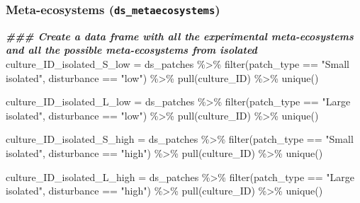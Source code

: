 \documentclass[
]{article}
\newenvironment{Shaded}{\begin{snugshade}}{\end{snugshade}}
\newcommand{\DocumentationTok}[1]{\textcolor[rgb]{0.56,0.35,0.01}{\textbf{\textit{#1}}}}
\newcommand{\FunctionTok}[1]{\textcolor[rgb]{0.00,0.00,0.00}{#1}}
\newcommand{\NormalTok}[1]{#1}
\newcommand{\OtherTok}[1]{\textcolor[rgb]{0.56,0.35,0.01}{#1}}
\newcommand{\SpecialCharTok}[1]{\textcolor[rgb]{0.00,0.00,0.00}{#1}}
\newcommand{\StringTok}[1]{\textcolor[rgb]{0.31,0.60,0.02}{#1}}
\begin{document}
\hypertarget{meta-ecosystems-ds_metaecosystems}{%
\subsubsection{\texorpdfstring{Meta-ecosystems
(\texttt{ds\_metaecosystems})}{Meta-ecosystems (ds\_metaecosystems)}}\label{meta-ecosystems-ds_metaecosystems}}

\begin{Shaded}
\begin{Highlighting}[]
\DocumentationTok{\#\#\# Create a data frame with all the experimental meta{-}ecosystems and all the possible meta{-}ecosystems from isolated}
\NormalTok{culture\_ID\_isolated\_S\_low }\OtherTok{=}\NormalTok{ ds\_patches }\SpecialCharTok{\%\textgreater{}\%}
  \FunctionTok{filter}\NormalTok{(patch\_type }\SpecialCharTok{==} \StringTok{"Small isolated"}\NormalTok{,}
\NormalTok{         disturbance }\SpecialCharTok{==} \StringTok{"low"}\NormalTok{) }\SpecialCharTok{\%\textgreater{}\%}
  \FunctionTok{pull}\NormalTok{(culture\_ID) }\SpecialCharTok{\%\textgreater{}\%}
  \FunctionTok{unique}\NormalTok{()}

\NormalTok{culture\_ID\_isolated\_L\_low }\OtherTok{=}\NormalTok{ ds\_patches }\SpecialCharTok{\%\textgreater{}\%}
  \FunctionTok{filter}\NormalTok{(patch\_type }\SpecialCharTok{==} \StringTok{"Large isolated"}\NormalTok{,}
\NormalTok{         disturbance }\SpecialCharTok{==} \StringTok{"low"}\NormalTok{) }\SpecialCharTok{\%\textgreater{}\%}
  \FunctionTok{pull}\NormalTok{(culture\_ID) }\SpecialCharTok{\%\textgreater{}\%}
  \FunctionTok{unique}\NormalTok{()}

\NormalTok{culture\_ID\_isolated\_S\_high }\OtherTok{=}\NormalTok{ ds\_patches }\SpecialCharTok{\%\textgreater{}\%}
  \FunctionTok{filter}\NormalTok{(patch\_type }\SpecialCharTok{==} \StringTok{"Small isolated"}\NormalTok{,}
\NormalTok{         disturbance }\SpecialCharTok{==} \StringTok{"high"}\NormalTok{) }\SpecialCharTok{\%\textgreater{}\%}
  \FunctionTok{pull}\NormalTok{(culture\_ID) }\SpecialCharTok{\%\textgreater{}\%}
  \FunctionTok{unique}\NormalTok{()}

\NormalTok{culture\_ID\_isolated\_L\_high }\OtherTok{=}\NormalTok{ ds\_patches }\SpecialCharTok{\%\textgreater{}\%}
  \FunctionTok{filter}\NormalTok{(patch\_type }\SpecialCharTok{==} \StringTok{"Large isolated"}\NormalTok{,}
\NormalTok{         disturbance }\SpecialCharTok{==} \StringTok{"high"}\NormalTok{) }\SpecialCharTok{\%\textgreater{}\%}
  \FunctionTok{pull}\NormalTok{(culture\_ID) }\SpecialCharTok{\%\textgreater{}\%}
  \FunctionTok{unique}\NormalTok{()}


\end{Highlighting}
\end{Shaded}
\end{document}

